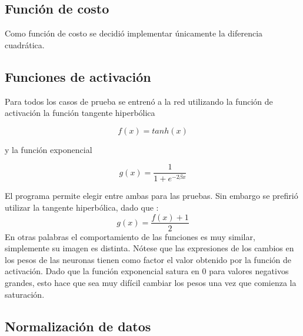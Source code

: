 \documentclass[%
    final,
    reprint,
    notitlepage,
    narroweqnarray,
    inline,
    twoside,
    invited
    ]{ieee}
\begin{document}
\subsection{Función de costo}

Como función de costo se decidió implementar únicamente la diferencia cuadrática.


\subsection{Funciones de activación}

\par Para todos los casos de prueba se entrenó a la red utilizando la función de activación la función tangente hiperbólica

\begin{equation}
f(x) = tanh(x)
\end{equation}


y la función exponencial

\begin{equation}
g(x) = \frac{1}{1+e^{-2 \beta x}}
\end{equation}

El programa permite elegir entre ambas para las pruebas. Sin embargo se prefirió utilizar la tangente hiperbólica, dado que :
\begin{equation}
g(x) = \frac{f(x) + 1}{2}
\end{equation}
En otras palabras el comportamiento de las funciones es muy similar, simplemente su imagen es distinta. Nótese que las 
expresiones de los cambios en los pesos de las neuronas tienen como factor el valor  obtenido 
por la función de activación. Dado que la función exponencial satura en $0$ para valores negativos grandes, esto 
hace que sea muy difícil cambiar los pesos una vez que comienza la saturación.

\subsection{Normalización de datos}
\end{document}
